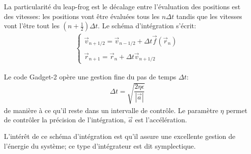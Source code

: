 			La particularité du leap-frog est le décalage entre l'évaluation des positions est des vitesses:
			les positions vont être évaluées tous les $n\Delta t$ tandis que les vitesses vont l'être tout
			les $(n+\frac{1}{2})\Delta t$.
			Le schéma d'intégration s'écrit:
			\begin{align*}
				\begin{cases}
					\vec{v}_{n+1/2} = \vec{v}_{n-1/2} + \Delta t\vec{f}(\vec{r}_n) \\
					\\
					\vec{r}_{n+1} = \vec{r}_n +\Delta t\vec{v}_{n+1/2}
				\end{cases}
			\end{align*}

			Le code Gadget-2 opère une gestion fine du pas de temps $\Delta t$:
			\begin{align*}
				\Delta t = \sqrt{\dfrac{2\eta\epsilon}{|\vec{a}|}}
			\end{align*}
			de manière à ce qu'il reste dans un intervalle de contrôle.
			Le paramètre $\eta$ permet de contrôler la précision de l'intégration, $\vec{a}$ est l'accélération.

			L'intérêt de ce schéma d'intégration est qu'il assure une excellente gestion de l'énergie du système; ce type d'intégrateur est dit symplectique.


